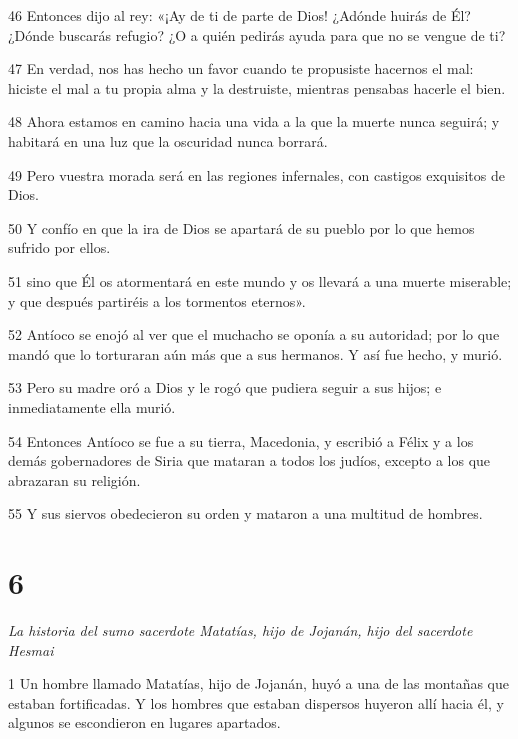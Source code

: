 \par 46 Entonces dijo al rey: «¡Ay de ti de parte de Dios! ¿Adónde huirás de Él? ¿Dónde buscarás refugio? ¿O a quién pedirás ayuda para que no se vengue de ti?

\par 47 En verdad, nos has hecho un favor cuando te propusiste hacernos el mal: hiciste el mal a tu propia alma y la destruiste, mientras pensabas hacerle el bien.

\par 48 Ahora estamos en camino hacia una vida a la que la muerte nunca seguirá; y habitará en una luz que la oscuridad nunca borrará.

\par 49 Pero vuestra morada será en las regiones infernales, con castigos exquisitos de Dios.

\par 50 Y confío en que la ira de Dios se apartará de su pueblo por lo que hemos sufrido por ellos.

\par 51 sino que Él os atormentará en este mundo y os llevará a una muerte miserable; y que después partiréis a los tormentos eternos».

\par 52 Antíoco se enojó al ver que el muchacho se oponía a su autoridad; por lo que mandó que lo torturaran aún más que a sus hermanos. Y así fue hecho, y murió.

\par 53 Pero su madre oró a Dios y le rogó que pudiera seguir a sus hijos; e inmediatamente ella murió.

\par 54 Entonces Antíoco se fue a su tierra, Macedonia, y escribió a Félix y a los demás gobernadores de Siria que mataran a todos los judíos, excepto a los que abrazaran su religión.

\par 55 Y sus siervos obedecieron su orden y mataron a una multitud de hombres.

\chapter{6}

\par \textit{La historia del sumo sacerdote Matatías, hijo de Jojanán, hijo del sacerdote Hesmai}

\par 1 Un hombre llamado Matatías, hijo de Jojanán, huyó a una de las montañas que estaban fortificadas. Y los hombres que estaban dispersos huyeron allí hacia él, y algunos se escondieron en lugares apartados.

